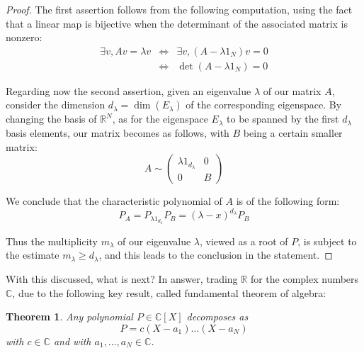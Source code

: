 \documentclass[12pt]{amsbook}
\newtheorem{theorem}{Theorem}[chapter]
\begin{document}
\begin{proof}
The first assertion follows from the following computation, using the fact that a linear map is bijective when the determinant of the associated matrix is nonzero:
\begin{eqnarray*}
\exists v,Av=\lambda v
&\iff&\exists v,(A-\lambda 1_N)v=0\\
&\iff&\det(A-\lambda 1_N)=0
\end{eqnarray*}

Regarding now the second assertion, given an eigenvalue $\lambda$ of our matrix $A$, consider the dimension $d_\lambda=\dim(E_\lambda)$ of the corresponding eigenspace. By changing the basis of $\mathbb R^N$, as for the eigenspace $E_\lambda$ to be spanned by the first $d_\lambda$ basis elements, our matrix becomes as follows, with $B$ being a certain smaller matrix:
$$A\sim\begin{pmatrix}\lambda 1_{d_\lambda}&0\\0&B\end{pmatrix}$$

We conclude that the characteristic polynomial of $A$ is of the following form:
$$P_A
=P_{\lambda 1_{d_\lambda}}P_B
=(\lambda-x)^{d_\lambda}P_B$$

Thus the multiplicity $m_\lambda$ of our eigenvalue $\lambda$, viewed as a root of $P$, is subject to the estimate $m_\lambda\geq d_\lambda$, and this leads to the conclusion in the statement.
\end{proof}

With this discussed, what is next? In answer, trading $\mathbb R$ for the complex numbers $\mathbb C$, due to the following key result, called fundamental theorem of algebra:


\begin{theorem}
Any polynomial $P\in\mathbb C[X]$ decomposes as
$$P=c(X-a_1)\ldots (X-a_N)$$
with $c\in\mathbb C$ and with $a_1,\ldots,a_N\in\mathbb C$.
\end{theorem}
\end{document}
